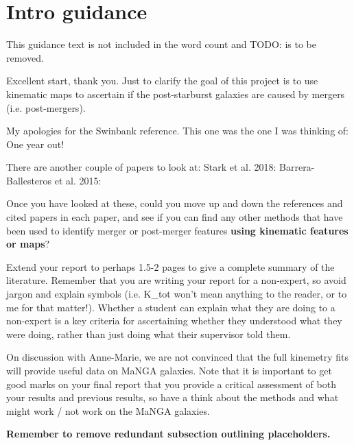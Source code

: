 \section*{Intro guidance}

This guidance text is not included in the word count and TODO: is to be removed.


Excellent start, thank you. Just to clarify the goal of this project is to use kinematic maps to ascertain if the post-starburst galaxies are caused by mergers (i.e. post-mergers). 

My apologies for the Swinbank reference. This one was the one I was thinking of: \citet{2012MNRAS.420..672S} One year out!
 
There are another couple of papers to look at:
Stark et al. 2018: \citep{2018MNRAS.480.2217S} 
Barrera-Ballesteros et al. 2015: \citep{2015A&A...582A..21B}
 
Once you have looked at these, could you move up and down the references and cited papers in each paper, and see if you can find any other methods that have been used to identify merger or post-merger features \textbf{using kinematic features or maps}?
 
Extend your report to perhaps 1.5-2 pages to give a complete summary of the literature.
Remember that you are writing your report for a non-expert, so avoid jargon and explain symbols (i.e. K\_tot won't mean anything to the reader, or to me for that matter!). Whether a student can explain what they are doing to a non-expert is a key criteria for ascertaining whether they understood what they were doing, rather than just doing what their supervisor told them. 

On discussion with Anne-Marie, we are not convinced that the full kinemetry fits will provide useful data on MaNGA galaxies. Note that it is important to get good marks on your final report that you provide a critical assessment of both your results and previous results, so have a think about the methods and what might work / not work on the MaNGA galaxies. 

\vspace{6pt}
\textbf{Remember to remove redundant subsection outlining placeholders.}
